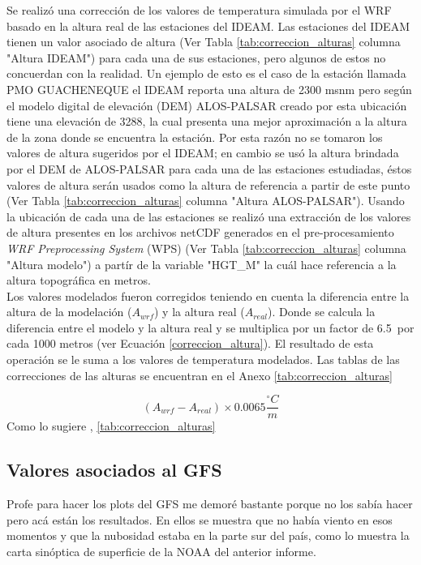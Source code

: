 Se realizó una corrección de los valores de temperatura simulada por el WRF basado en la altura real de las estaciones del IDEAM. Las estaciones del IDEAM tienen un valor asociado de altura (Ver Tabla \ref{tab:correccion_alturas} columna "Altura IDEAM") para cada una de sus estaciones, pero algunos de estos no concuerdan con la realidad. Un ejemplo de esto es el caso de la estación llamada PMO GUACHENEQUE el IDEAM reporta una altura de 2300 msnm pero según el modelo digital de elevación (DEM) ALOS-PALSAR creado por \citet{ASFDAAC2007} esta ubicación tiene una elevación de 3288, la cual presenta una mejor aproximación a la altura de la zona donde se encuentra la estación. Por esta razón no se tomaron los valores de altura sugeridos por el IDEAM; en cambio se usó la altura brindada por el DEM de ALOS-PALSAR para cada una de las estaciones estudiadas, éstos valores de altura serán usados como la altura de referencia a partir de este punto (Ver Tabla \ref{tab:correccion_alturas} columna "Altura ALOS-PALSAR"). Usando la ubicación de cada una de las estaciones se realizó una extracción de los valores de altura presentes en los archivos netCDF generados en el pre-procesamiento \textit{WRF Preprocessing System} (WPS) (Ver Tabla \ref{tab:correccion_alturas} columna "Altura modelo") a partír de la variable "HGT\_M" la cuál hace referencia a la altura topográfica en metros.\\

Los valores modelados fueron corregidos teniendo en cuenta la diferencia entre la altura de la modelación ($A_{wrf}$) y la altura real ($A_{real}$). Donde se calcula la diferencia entre el modelo y la altura real y se multiplica por un factor de 6.5\celc\ por cada 1000 metros (ver Ecuación \ref{correccion_altura}). El resultado de esta operación se le suma a los valores de temperatura modelados. Las tablas de las correcciones de las alturas se encuentran en el Anexo \ref{tab:correccion_alturas}

\begin{equation} \label{correccion_altura}
(A_{wrf} - A_{real}) \times 0.0065 \frac{^{\circ}C}{m}
\end{equation}
 Como lo sugiere \citet{ValenciaMonroy2015}, 
 \ref{tab:correccion_alturas}
 
\subsection{Valores asociados al GFS}
 
Profe para hacer los plots del GFS me demoré bastante porque no los sabía hacer pero acá están los resultados. En ellos se muestra que no había viento en esos momentos y que la nubosidad estaba en la parte sur del país, como lo muestra la carta sinóptica de superficie de la NOAA del anterior informe.

